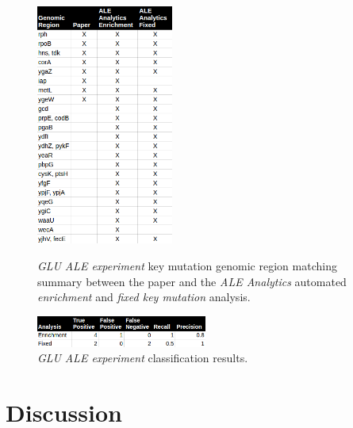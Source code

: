\documentclass[12pt,final,masters,chapterheads]{ucsd}  %
\begin{document}
\begin{figure}[H]
  \caption{\textit{GLU} \textit{ALE experiment} {key mutation} genomic region matching summary between the paper and the \textit{ALE Analytics} automated \textit{enrichment} and \textit{fixed key mutation} analysis.}
  \centering
  \includegraphics[width=0.4\textwidth]{glu_key_mutation_regions.png}
  \label{fig:}
\end{figure}
\begin{figure}[H]
  \centering
   \caption{\textit{GLU} \textit{ALE experiment} classification results.}
  \includegraphics[width=0.5\textwidth]{c13_precision_recall.png}
\end{figure}

\chapter{Discussion}
%
%
%
%
%
%
%
%
%
%
\end{document}
